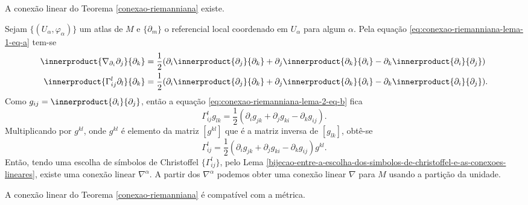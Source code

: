 \begin{lema}\label{conexao-riemanniana-lema-2}
	A conexão linear do Teorema \ref{conexao-riemanniana} existe.
\end{lema}

\begin{demonstracao}
	Sejam
	$\{ (U_{\alpha}, \varphi_{\alpha}) \}$ um atlas de $M$ e
	$\{ \partial_m \}$ o referencial local coordenado em $U_{\alpha}$ para algum $\alpha$.
	Pela equação \eqref{eq:conexao-riemanniana-lema-1-eq-a} tem-se
	\begin{equation}\label{eq:conexao-riemanniana-lema-2-eq-b}
		\begin{split}
			\innerproduct{\nabla_{\partial_i} \partial_j}{\partial_k} &= \frac{1}{2} (\partial_i \innerproduct{\partial_j}{\partial_k} + \partial_j \innerproduct{\partial_k}{\partial_i} - \partial_k \innerproduct{\partial_i}{\partial_j})\\
			\innerproduct{\Gamma_{ij}^l \partial_l}{\partial_k} &= \frac{1}{2} (\partial_i \innerproduct{\partial_j}{\partial_k} + \partial_j \innerproduct{\partial_k}{\partial_i} - \partial_k \innerproduct{\partial_i}{\partial_j}).		
		\end{split}		
	\end{equation}
	Como $g_{ij} = \innerproduct{\partial_i}{\partial_j}$, então a equação \eqref{eq:conexao-riemanniana-lema-2-eq-b} fica
	\begin{equation}\label{eq:conexao-riemanniana-lema-2-eq-a}
		\Gamma_{ij}^l g_{lk} = \frac{1}{2} (\partial_i g_{jk} + \partial_j g_{ki} - \partial_k g_{ij}).
	\end{equation}
	Multiplicando por $g^{kl}$, onde $g^{kl}$ é elemento da matriz $[g^{kl}]$ que é a matriz inversa de $[g_{lk}]$, obtê-se
	\begin{equation*}
		\Gamma_{ij}^l = \frac{1}{2} (\partial_i g_{jk} + \partial_j g_{ki} - \partial_k g_{ij}) g^{kl}.
	\end{equation*}
	Então, tendo uma escolha de símbolos de Christoffel $\{ \Gamma_{ij}^l \}$, pelo Lema \ref{bijecao-entre-a-escolha-dos-simbolos-de-christoffel-e-as-conexoes-lineares}, existe uma conexão linear $\nabla^{\alpha}$.
	A partir dos $\nabla^{\alpha}$ podemos obter uma conexão linear $\nabla$ para $M$ usando a partição da unidade.
\end{demonstracao}

\begin{lema}\label{conexao-riemanniana-lema-3}
	A conexão linear do Teorema \ref{conexao-riemanniana} é compatível com a métrica.
\end{lema}

